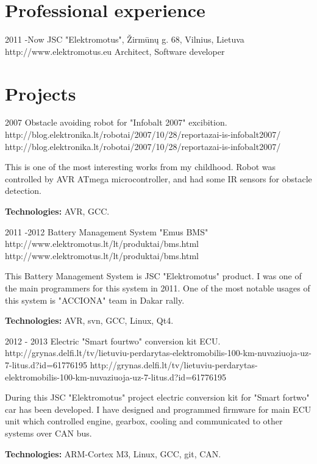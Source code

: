 \documentclass[12]{article}
\begin{document}

\section{Professional experience}

\job
{2011 -}{Now}
{JSC "Elektromotus", Žirmūnų g. 68, Vilnius, Lietuva}
{http://www.elektromotus.eu}
{Architect, Software developer}
{
}


\section{Projects}

\job
{2007}{}
{Obstacle avoiding robot for "Infobalt 2007" excibition.}
{http://blog.elektronika.lt/robotai/2007/10/28/reportazai-is-infobalt2007/}
{http://blog.elektronika.lt/robotai/2007/10/28/reportazai-is-infobalt2007/}
{This is one of the most interesting works from my childhood.
Robot was controlled by AVR ATmega microcontroller, and had some IR sensors for obstacle detection. \\
\rule{0mm}{5mm}\textbf{Technologies:} AVR, GCC.}


\job
{2011 -}{2012}
{Battery Management System "Emus BMS"}
{http://www.elektromotus.lt/lt/produktai/bms.html}
{http://www.elektromotus.lt/lt/produktai/bms.html}
{
This Battery Management System is JSC "Elektromotus" product.
I was one of the main programmers for this system in 2011.
One of the most notable usages of this system is "ACCIONA" team in Dakar rally.\\
\rule{0mm}{5mm}\textbf{Technologies:} AVR, svn, GCC, Linux, Qt4.}

\job
{2012 - }{2013}
{Electric "Smart fourtwo" conversion kit ECU.}
{http://grynas.delfi.lt/tv/lietuviu-perdarytas-elektromobilis-100-km-nuvaziuoja-uz-7-litus.d?id=61776195}
{http://grynas.delfi.lt/tv/lietuviu-perdarytas-elektromobilis-100-km-nuvaziuoja-uz-7-litus.d?id=61776195}
{
During this JSC "Elektromotus" project electric conversion kit for "Smart fortwo" car has been developed.
I have designed and programmed firmware for main ECU unit which controlled engine, gearbox, cooling and communicated to other systems over CAN bus.\\
\rule{0mm}{5mm}\textbf{Technologies:} ARM-Cortex M3, Linux, GCC, git, CAN.}
\end{document}
